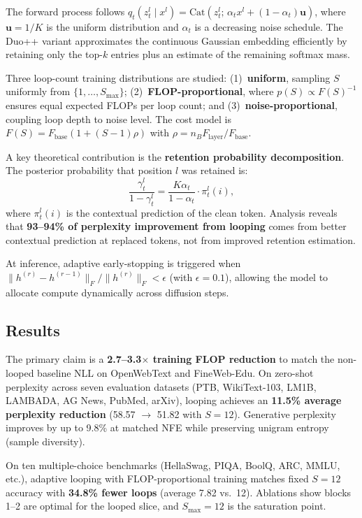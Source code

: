 \documentclass[11pt,a4paper]{article}
\begin{document}
The forward process follows $q_t(z_t^l \mid x^l) = \mathrm{Cat}(z_t^l;\, \alpha_t x^l + (1{-}\alpha_t)\mathbf{u})$, where $\mathbf{u} = 1/K$ is the uniform distribution and $\alpha_t$ is a decreasing noise schedule. The Duo++ variant approximates the continuous Gaussian embedding efficiently by retaining only the top-$k$ entries plus an estimate of the remaining softmax mass.

Three loop-count training distributions are studied: (1)~\textbf{uniform}, sampling $S$ uniformly from $\{1, \ldots, S_{\max}\}$; (2)~\textbf{FLOP-proportional}, where $p(S) \propto F(S)^{-1}$ ensures equal expected FLOPs per loop count; and (3)~\textbf{noise-proportional}, coupling loop depth to noise level. The cost model is $F(S) = F_{\text{base}}(1 + (S{-}1)\rho)$ with $\rho = n_B F_{\text{layer}} / F_{\text{base}}$.

A key theoretical contribution is the \textbf{retention probability decomposition}. The posterior probability that position $l$ was retained is:
\begin{equation}
  \frac{\gamma_t^l}{1 - \gamma_t^l} = \frac{K \alpha_t}{1 - \alpha_t} \cdot \pi_t^l(i),
\end{equation}
where $\pi_t^l(i)$ is the contextual prediction of the clean token. Analysis reveals that \textbf{93--94\% of perplexity improvement from looping} comes from better contextual prediction at replaced tokens, not from improved retention estimation.

At inference, adaptive early-stopping is triggered when $\|h^{(r)} - h^{(r{-}1)}\|_F / \|h^{(r)}\|_F < \epsilon$ (with $\epsilon = 0.1$), allowing the model to allocate compute dynamically across diffusion steps.

\subsection{Results}
The primary claim is a \textbf{2.7--3.3$\times$ training FLOP reduction} to match the non-looped baseline NLL on OpenWebText and FineWeb-Edu. On zero-shot perplexity across seven evaluation datasets (PTB, WikiText-103, LM1B, LAMBADA, AG News, PubMed, arXiv), looping achieves an \textbf{11.5\% average perplexity reduction} (58.57 $\to$ 51.82 with $S=12$). Generative perplexity improves by up to 9.8\% at matched NFE while preserving unigram entropy (sample diversity).

On ten multiple-choice benchmarks (HellaSwag, PIQA, BoolQ, ARC, MMLU, etc.), adaptive looping with FLOP-proportional training matches fixed $S=12$ accuracy with \textbf{34.8\% fewer loops} (average 7.82 vs.\ 12). Ablations show blocks 1--2 are optimal for the looped slice, and $S_{\max} = 12$ is the saturation point.
\end{document}

